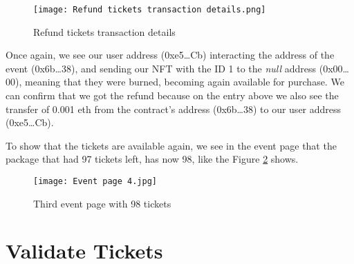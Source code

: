 \begin{figure}[H]
    \texttt{[image: Refund tickets transaction details.png]}
    \centering
    \caption{Refund tickets transaction details}
    \label{fig:refund_tickets_transaction_details}
\end{figure}

Once again, we see our user address (0xe5{\dots}Cb) interacting the address of
the event (0x6b\dots38), and sending our NFT with the ID 1 to the \textit{null}
address (0x00\dots00), meaning that they were burned, becoming again available
for purchase. We can confirm that we got the refund because on the entry above
we also see the transfer of 0.001 eth from the contract's address (0x6b\dots38)
to our user address (0xe5{\dots}Cb).

To show that the tickets are available again, we see in the event page that the
package that had 97 tickets left, has now 98, like the Figure
\ref{fig:refund_tickets_event} shows.

\begin{figure}[H]
    \texttt{[image: Event page 4.jpg]}
    \centering
    \caption{Third event page with 98 tickets}
    \label{fig:refund_tickets_event}
\end{figure}

\section{Validate Tickets}
\label{sec:validate_tickets}

